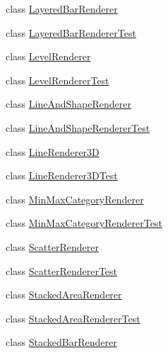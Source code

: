 \begin{DoxyCompactItemize}
class \mbox{\hyperlink{classorg_1_1jfree_1_1chart_1_1renderer_1_1category_1_1_layered_bar_renderer}{Layered\+Bar\+Renderer}}
\item 
class \mbox{\hyperlink{classorg_1_1jfree_1_1chart_1_1renderer_1_1category_1_1_layered_bar_renderer_test}{Layered\+Bar\+Renderer\+Test}}
\item 
class \mbox{\hyperlink{classorg_1_1jfree_1_1chart_1_1renderer_1_1category_1_1_level_renderer}{Level\+Renderer}}
\item 
class \mbox{\hyperlink{classorg_1_1jfree_1_1chart_1_1renderer_1_1category_1_1_level_renderer_test}{Level\+Renderer\+Test}}
\item 
class \mbox{\hyperlink{classorg_1_1jfree_1_1chart_1_1renderer_1_1category_1_1_line_and_shape_renderer}{Line\+And\+Shape\+Renderer}}
\item 
class \mbox{\hyperlink{classorg_1_1jfree_1_1chart_1_1renderer_1_1category_1_1_line_and_shape_renderer_test}{Line\+And\+Shape\+Renderer\+Test}}
\item 
class \mbox{\hyperlink{classorg_1_1jfree_1_1chart_1_1renderer_1_1category_1_1_line_renderer3_d}{Line\+Renderer3D}}
\item 
class \mbox{\hyperlink{classorg_1_1jfree_1_1chart_1_1renderer_1_1category_1_1_line_renderer3_d_test}{Line\+Renderer3\+D\+Test}}
\item 
class \mbox{\hyperlink{classorg_1_1jfree_1_1chart_1_1renderer_1_1category_1_1_min_max_category_renderer}{Min\+Max\+Category\+Renderer}}
\item 
class \mbox{\hyperlink{classorg_1_1jfree_1_1chart_1_1renderer_1_1category_1_1_min_max_category_renderer_test}{Min\+Max\+Category\+Renderer\+Test}}
\item 
class \mbox{\hyperlink{classorg_1_1jfree_1_1chart_1_1renderer_1_1category_1_1_scatter_renderer}{Scatter\+Renderer}}
\item 
class \mbox{\hyperlink{classorg_1_1jfree_1_1chart_1_1renderer_1_1category_1_1_scatter_renderer_test}{Scatter\+Renderer\+Test}}
\item 
class \mbox{\hyperlink{classorg_1_1jfree_1_1chart_1_1renderer_1_1category_1_1_stacked_area_renderer}{Stacked\+Area\+Renderer}}
\item 
class \mbox{\hyperlink{classorg_1_1jfree_1_1chart_1_1renderer_1_1category_1_1_stacked_area_renderer_test}{Stacked\+Area\+Renderer\+Test}}
\item 
class \mbox{\hyperlink{classorg_1_1jfree_1_1chart_1_1renderer_1_1category_1_1_stacked_bar_renderer}{Stacked\+Bar\+Renderer}}
\item 

\end{DoxyCompactItemize}
